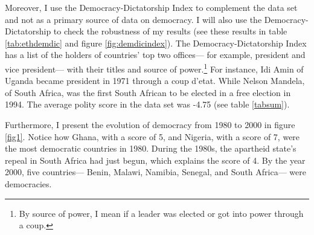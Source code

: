 \documentclass{wptemp}
\begin{document}
Moreover, I use the Democracy-Dictatorship Index to complement the data set and not as a primary source of data on democracy. I will also use the Democracy-Dictatorship to check the robustness of my results (see these results in table \ref{tab:ethdemdic} and figure \ref{fig:demdicindex}). The Democracy-Dictatorship Index \citep{cheibub2010democracy} has a list of the holders of countries' top two offices--- for example, president and vice president--- with their titles and source of power.\footnote{By source of power, I mean if a leader was elected or got into power through a coup.} For instance, Idi Amin of Uganda became president in 1971 through a coup d'etat. While Nelson Mandela, of South Africa, was the first South African to be elected in a free election in 1994. The average polity score in the data set was -4.75 (see table \ref{tabsum}). 

Furthermore, I present the evolution of democracy from 1980 to 2000 in figure \ref{fig1}. Notice how Ghana, with a score of 5, and Nigeria, with a score of 7, were the most democratic countries in 1980. During the 1980s, the apartheid state's repeal in South Africa had just begun, which explains the score of 4. By the year 2000, five countries--- Benin, Malawi, Namibia, Senegal, and South Africa--- were democracies. 
\end{document}
